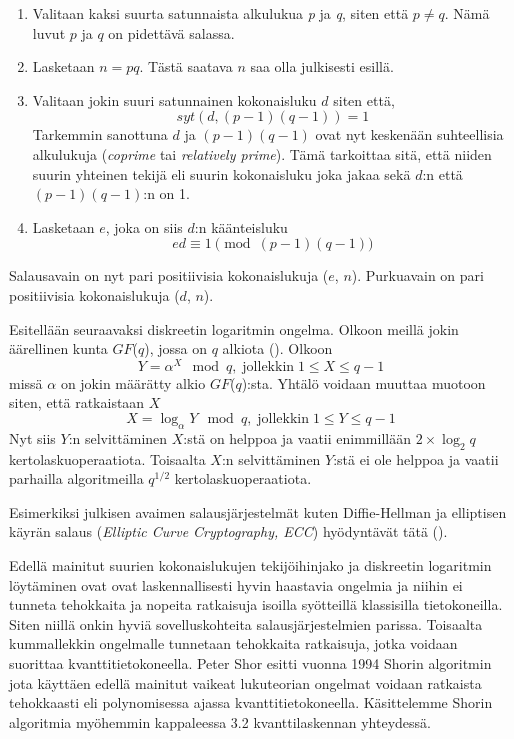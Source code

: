   \begin{enumerate}
  
      \item Valitaan kaksi suurta satunnaista alkulukua \emph{p} ja \emph{q}, siten että $p \neq q$. Nämä luvut $p$ ja $q$ on pidettävä salassa.
      
      \item Lasketaan $n = pq$. Tästä saatava $n$ saa olla julkisesti esillä.
      
      \item Valitaan jokin suuri satunnainen kokonaisluku $d$ siten että,
      \[syt(d, (p-1)(q-1)) = 1\]
      Tarkemmin sanottuna $d$ ja $(p-1)(q-1)$ ovat nyt keskenään suhteellisia alkulukuja (\emph{coprime} tai \emph{relatively prime}). Tämä tarkoittaa sitä, että niiden suurin yhteinen tekijä eli suurin kokonaisluku joka jakaa sekä $d$:n että $(p-1)(q-1)$:n on 1.
      
      \item Lasketaan $e$, joka on siis $d$:n käänteisluku
      \[e d \equiv 1 \pmod{(p-1) (q-1)}\]
      
  \end{enumerate}
  Salausavain on nyt pari positiivisia kokonaislukuja ($e$, $n$). Purkuavain on pari positiivisia kokonaislukuja ($d$, $n$).
  
 Esitellään seuraavaksi diskreetin logaritmin ongelma. Olkoon meillä jokin äärellinen kunta $GF$($q$), jossa on $q$ alkiota (\cite{1055638}). Olkoon
 \begin{equation}
     \label{eq10}
     Y = \alpha^{X} \mod q, \; \text{jollekkin} \; 1 \leq X \leq q-1
 \end{equation}
 missä $\alpha$ on jokin määrätty alkio $GF$($q$):sta. Yhtälö voidaan muuttaa muotoon siten, että ratkaistaan $X$ 
 \begin{equation}
     \label{eq11}
     X = \log_{\alpha} Y \mod q, \; \text{jollekkin} \; 1 \leq Y \leq q-1
 \end{equation}
 Nyt siis $Y$:n selvittäminen $X$:stä on helppoa ja vaatii enimmillään $2 \times \log_{2}q$ kertolaskuoperaatiota. Toisaalta $X$:n selvittäminen $Y$:stä ei ole helppoa ja vaatii parhailla algoritmeilla $q^{1/2}$ kertolaskuoperaatiota.
 
 Esimerkiksi julkisen avaimen salausjärjestelmät kuten Diffie-Hellman ja elliptisen käyrän salaus (\emph{Elliptic Curve Cryptography, ECC}) hyödyntävät tätä (\cite{mavroeidis2018impact}).
 
 Edellä mainitut suurien kokonaislukujen tekijöihinjako ja diskreetin logaritmin löytäminen ovat ovat laskennallisesti hyvin haastavia ongelmia ja niihin ei tunneta tehokkaita ja nopeita ratkaisuja isoilla syötteillä klassisilla tietokoneilla. Siten niillä onkin hyviä sovelluskohteita salausjärjestelmien parissa. Toisaalta kummallekkin ongelmalle tunnetaan tehokkaita ratkaisuja, jotka voidaan suorittaa kvanttitietokoneella. Peter Shor esitti vuonna 1994 Shorin algoritmin jota käyttäen edellä mainitut vaikeat lukuteorian ongelmat voidaan ratkaista tehokkaasti eli polynomisessa ajassa kvanttitietokoneella. Käsittelemme Shorin algoritmia myöhemmin kappaleessa 3.2 kvanttilaskennan yhteydessä.
 
